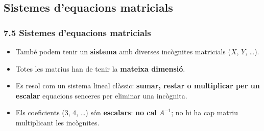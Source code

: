 \documentclass[aspectratio=169]{beamer}
\begin{document}
\subsection{Sistemes d'equacions matricials}

\begin{frame}[t]
  \frametitle{7.5 Sistemes d'equacions matricials}

  \vspace{-0.28cm}
  \begin{itemize}
    \item<1-> També podem tenir un \textbf{sistema} amb diverses incògnites matricials ($X$, $Y$, \ldots).
    \item<2-> Totes les matrius han de tenir la \textbf{mateixa dimensió}.
    \item<3-> Es resol com un sistema lineal clàssic: \textbf{sumar, restar o multiplicar per un escalar} equacions senceres per eliminar una incògnita.
    \item<4-> Els coeficients ($3$, $4$, \ldots) són \textbf{escalars}: \textbf{no cal} $A^{-1}$; no hi ha cap matriu multiplicant les incògnites.
  \end{itemize}

\end{frame}
\end{document}
